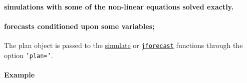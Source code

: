 \paragraph{simulations with some of the non-linear equations solved
exactly.}\label{simulations-with-some-of-the-non-linear-equations-solved-exactly.}

\paragraph{forecasts conditioned upon some
variables;}\label{forecasts-conditioned-upon-some-variables}

The plan object is passed to the \href{model/simulate}{simulate} or
\href{model/jforecast}{\texttt{jforecast}} functions through the option
\texttt{'plan='}.

\paragraph{Example}\label{example}


